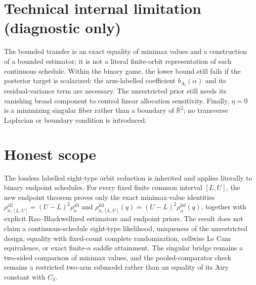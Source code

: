 \documentclass{article}
\begin{document}
\section*{Technical internal limitation (diagnostic only)}

The bounded transfer is an exact equality of minimax values and a construction of a bounded estimator; it is not a literal finite-orbit representation of each continuous schedule. Within the binary game, the lower bound still fails if the posterior target is scalarized: the arm-labelled coefficient \(b_{A_i}(\alpha)\) and its residual-variance term are necessary. The unrestricted prior still needs its vanishing broad component to control linear allocation sensitivity. Finally, \(\eta=0\) is a minimizing singular fiber rather than a boundary of \(\mathbb R^2\); no transverse Laplacian or boundary condition is introduced.

\section{Honest scope}

The lossless labelled eight-type orbit reduction is inherited and applies literally to binary endpoint schedules. For every fixed finite common interval \([L,U]\), the new endpoint theorem proves only the exact minimax-value identities \(\rho_{n,[L,U]}^{\mathrm{all}}=(U-L)^2\rho_n^{\mathrm{all}}\) and \(\rho_{n,[L,U]}^{\mathrm{iid}}(q)=(U-L)^2\rho_n^{\mathrm{iid}}(q)\), together with explicit Rao--Blackwellized estimators and endpoint priors. The result does not claim a continuous-schedule eight-type likelihood, uniqueness of the unrestricted design, equality with fixed-count complete randomization, cellwise Le Cam equivalence, or exact finite-\(n\) saddle attainment. The singular bridge remains a two-sided comparison of minimax values, and the pooled-comparator check remains a restricted two-arm submodel rather than an equality of its Airy constant with \(C_3\).
\end{document}

